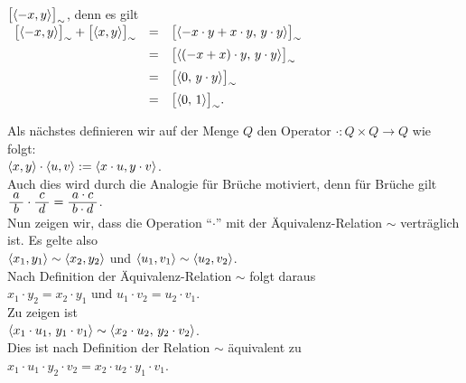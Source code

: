 $\bigl[\pair(-x,y)\bigr]_\sim$, denn es gilt
\\[0.2cm]
\hspace*{1.3cm}
$
\begin{array}[t]{lcl}
      \bigl[\pair(-x,y)\bigr]_\sim + \bigl[\pair(x,y)\bigr]_\sim 
& = & \bigl[\pair(-x \cdot y + x \cdot y,\, y \cdot y)\bigr]_\sim      \\[0.2cm]
& = & \bigl[\pair((-x + x) \cdot y,\, y \cdot y)\bigr]_\sim      \\[0.2cm]
& = & \bigl[\pair(0,\, y \cdot y)\bigr]_\sim      \\[0.2cm]
& = & \bigl[\pair(0,\, 1) \bigr]_\sim.
\end{array}
$
\vspace*{0.2cm}

\noindent
Als nächstes definieren wir auf der Menge $Q$ den Operator $\cdot: Q \times Q \rightarrow Q$ wie folgt:
\\[0.2cm]
\hspace*{1.3cm}
$\pair(x,y) \cdot \pair(u,v) := \pair(x \cdot u, y \cdot v)$.
\\[0.2cm]
Auch dies wird durch die Analogie für Brüche motiviert, denn für Brüche gilt
\\[0.2cm]
\hspace*{1.3cm}
$\bruch{a}{b} \cdot \bruch{c}{d} = \bruch{a \cdot c}{b \cdot d}$.
\\[0.2cm]
Nun zeigen wir, dass die Operation ``$\cdot$'' mit der Äquivalenz-Relation $\sim$ verträglich ist.
Es gelte also
\\[0.2cm]
\hspace*{1.3cm}
$\pair(x_1,y_1) \sim \pair(x_2,y_2)$ \quad und \quad
$\pair(u_1,v_1) \sim \pair(u_2,v_2)$.
\\[0.2cm]
Nach Definition der Äquivalenz-Relation $\sim$ folgt daraus
\\[0.2cm]
\hspace*{1.3cm}
$x_1 \cdot y_2 = x_2 \cdot y_1$ \quad und \quad
$u_1 \cdot v_2 = u_2 \cdot v_1$.
\\[0.2cm]
Zu zeigen ist 
\\[0.2cm]
\hspace*{1.3cm}
$\pair(x_1 \cdot u_1,\, y_1 \cdot v_1) \sim  \pair(x_2 \cdot u_2,\, y_2 \cdot v_2)$.
\\[0.2cm]
Dies ist nach Definition der Relation $\sim$ äquivalent zu
\\[0.2cm]
\hspace*{1.3cm}
$x_1 \cdot u_1 \cdot y_2 \cdot v_2 = x_2 \cdot u_2 \cdot y_1 \cdot v_1$.
\\[0.2cm]
